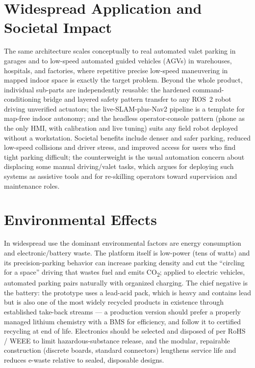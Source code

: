 \documentclass[12pt,a4paper]{report}
\begin{document}
\section{Widespread Application and Societal Impact}

The same architecture scales conceptually to real automated valet parking in
garages and to low-speed automated guided vehicles (AGVs) in warehouses,
hospitals, and factories, where repetitive precise low-speed maneuvering in
mapped indoor space is exactly the target problem. Beyond the whole product,
individual sub-parts are independently reusable: the hardened
command-conditioning bridge and layered safety pattern transfer to any
ROS~2 robot driving unverified actuators; the live-SLAM-plus-Nav2 pipeline is a
template for map-free indoor autonomy; and the headless operator-console pattern
(phone as the only HMI, with calibration and live tuning) suits any field robot
deployed without a workstation. Societal benefits include denser and safer
parking, reduced low-speed collisions and driver stress, and improved access for
users who find tight parking difficult; the counterweight is the usual automation
concern about displacing some manual driving/valet tasks, which argues for
deploying such systems as assistive tools and for re-skilling operators toward
supervision and maintenance roles.

\section{Environmental Effects}

In widespread use the dominant environmental factors are energy consumption and
electronic/battery waste. The platform itself is low-power (tens of watts) and
its precision-parking behavior can increase parking density and cut the
``circling for a space'' driving that wastes fuel and emits CO\textsubscript{2};
applied to electric vehicles, automated parking pairs naturally with organized
charging. The chief negative is the battery: the prototype uses a lead-acid pack,
which is heavy and contains lead but is also one of the most widely recycled
products in existence through established take-back streams --- a production
version should prefer a properly managed lithium chemistry with a BMS for
efficiency, and follow it to certified recycling at end of life. Electronics
should be selected and disposed of per RoHS / WEEE to limit hazardous-substance
release, and the modular, repairable construction (discrete boards, standard
connectors) lengthens service life and reduces e-waste relative to sealed,
disposable designs.
\end{document}

